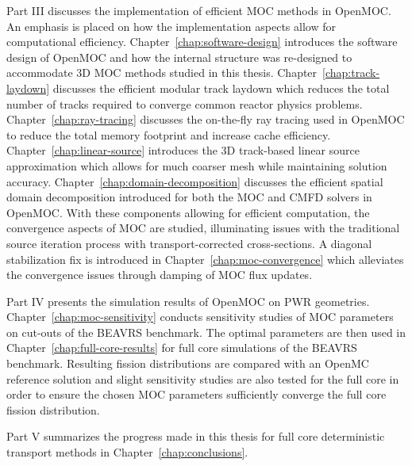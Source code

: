 Part III discusses the implementation of efficient \ac{MOC} methods in OpenMOC. An emphasis is placed on how the implementation aspects allow for computational efficiency. Chapter~\ref{chap:software-design} introduces the software design of OpenMOC and how the internal structure was re-designed to accommodate 3D \ac{MOC} methods studied in this thesis. Chapter~\ref{chap:track-laydown} discusses the efficient modular track laydown which reduces the total number of tracks required to converge common reactor physics problems. Chapter~\ref{chap:ray-tracing} discusses the on-the-fly ray tracing used in OpenMOC to reduce the total memory footprint and increase cache efficiency. Chapter~\ref{chap:linear-source} introduces the 3D track-based linear source approximation which allows for much coarser mesh while maintaining solution accuracy. Chapter~\ref{chap:domain-decomposition} discusses the efficient spatial domain decomposition introduced for both the \ac{MOC} and \ac{CMFD} solvers in OpenMOC. With these components allowing for efficient computation, the convergence aspects of \ac{MOC} are studied, illuminating issues with the traditional source iteration process with transport-corrected cross-sections. A diagonal stabilization fix is introduced in Chapter~\ref{chap:moc-convergence} which alleviates the convergence issues through damping of \ac{MOC} flux updates.

Part IV presents the simulation results of OpenMOC on \ac{PWR} geometries. Chapter~\ref{chap:moc-sensitivity} conducts sensitivity studies of \ac{MOC} parameters on cut-outs of the BEAVRS benchmark. The optimal parameters are then used in Chapter~\ref{chap:full-core-results} for full core simulations of the BEAVRS benchmark. Resulting fission distributions are compared with an OpenMC reference solution and slight sensitivity studies are also tested for the full core in order to ensure the chosen \ac{MOC} parameters sufficiently converge the full core fission distribution.

Part V summarizes the progress made in this thesis for full core deterministic transport methods in Chapter~\ref{chap:conclusions}.